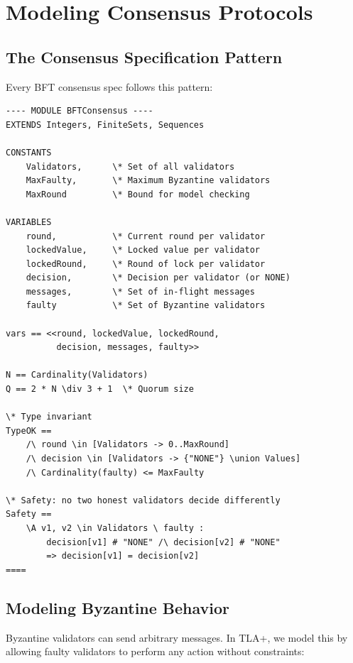 \section{Modeling Consensus Protocols}


\subsection{The Consensus Specification Pattern}

Every BFT consensus spec follows this pattern:

\begin{lstlisting}[language=TLA,caption={BFT consensus specification pattern}]
---- MODULE BFTConsensus ----
EXTENDS Integers, FiniteSets, Sequences

CONSTANTS
    Validators,      \* Set of all validators
    MaxFaulty,       \* Maximum Byzantine validators
    MaxRound         \* Bound for model checking

VARIABLES
    round,           \* Current round per validator
    lockedValue,     \* Locked value per validator
    lockedRound,     \* Round of lock per validator
    decision,        \* Decision per validator (or NONE)
    messages,        \* Set of in-flight messages
    faulty           \* Set of Byzantine validators

vars == <<round, lockedValue, lockedRound,
          decision, messages, faulty>>

N == Cardinality(Validators)
Q == 2 * N \div 3 + 1  \* Quorum size

\* Type invariant
TypeOK ==
    /\ round \in [Validators -> 0..MaxRound]
    /\ decision \in [Validators -> {"NONE"} \union Values]
    /\ Cardinality(faulty) <= MaxFaulty

\* Safety: no two honest validators decide differently
Safety ==
    \A v1, v2 \in Validators \ faulty :
        decision[v1] # "NONE" /\ decision[v2] # "NONE"
        => decision[v1] = decision[v2]
====
\end{lstlisting}

\subsection{Modeling Byzantine Behavior}

Byzantine validators can send arbitrary messages. In TLA+, we model this by allowing
faulty validators to perform any action without constraints:

